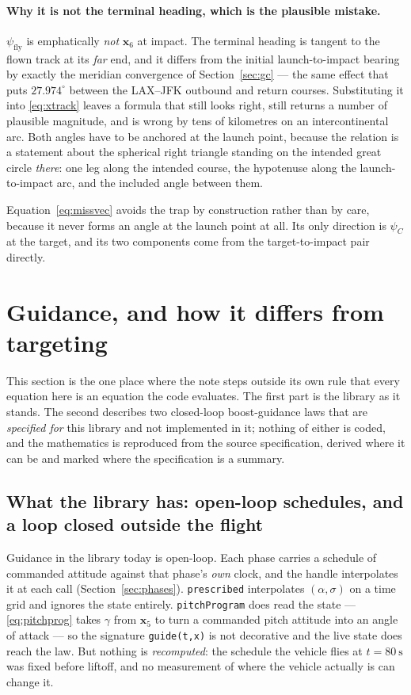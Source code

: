 \documentclass[11pt]{article}
\newcommand{\code}[1]{\texttt{#1}}
\begin{document}
\paragraph{Why it is not the terminal heading, which is the plausible mistake.}
$\psi_{\text{fly}}$ is emphatically \emph{not} $\mathbf{x}_6$ at impact. The
terminal heading is tangent to the flown track at its \emph{far} end, and it
differs from the initial launch-to-impact bearing by exactly the meridian
convergence of Section~\ref{sec:gc} --- the same effect that puts
$27.974^{\circ}$ between the LAX--JFK outbound and return courses. Substituting
it into \eqref{eq:xtrack} leaves a formula that still looks right, still
returns a number of plausible magnitude, and is wrong by tens of kilometres on
an intercontinental arc. Both angles have to be anchored at the launch point,
because the relation is a statement about the spherical right triangle standing
on the intended great circle \emph{there}: one leg along the intended course,
the hypotenuse along the launch-to-impact arc, and the included angle between
them.

Equation~\eqref{eq:missvec} avoids the trap by construction rather than by
care, because it never forms an angle at the launch point at all. Its only
direction is $\psi_C$ at the target, and its two components come from the
target-to-impact pair directly.

\section{Guidance, and how it differs from targeting}
\label{sec:guidance}

This section is the one place where the note steps outside its own rule that
every equation here is an equation the code evaluates. The first part is the
library as it stands. The second describes two closed-loop boost-guidance laws
that are \emph{specified for} this library and not implemented in it; nothing
of either is coded, and the mathematics is reproduced from the source
specification, derived where it can be and marked where the specification is a
summary.

\subsection{What the library has: open-loop schedules, and a loop closed
outside the flight}
\label{sec:openloop}

Guidance in the library today is open-loop. Each phase carries a schedule of
commanded attitude against that phase's \emph{own} clock, and the handle
interpolates it at each call (Section~\ref{sec:phases}). \code{prescribed}
interpolates $(\alpha,\sigma)$ on a time grid and ignores the state entirely.
\code{pitchProgram} does read the state --- \eqref{eq:pitchprog} takes $\gamma$
from $\mathbf{x}_5$ to turn a commanded pitch attitude into an angle of attack
--- so the signature \code{guide(t,x)} is not decorative and the live state does
reach the law. But nothing is \emph{recomputed}: the schedule the vehicle flies
at $t=80~\mathrm{s}$ was fixed before liftoff, and no measurement of where the
vehicle actually is can change it.
\end{document}
